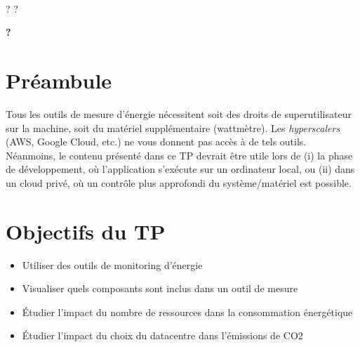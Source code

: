\documentclass[a4paper,10pt]{article}
\newcommand{\tdtitle}{?}
\newcommand{\tdnumber}{?}
\newcommand{\tdlongtitle}{?}
\renewcommand{\maketitle}{%
  ~\\
  \begin{center}
    {\huge \tdtitle{} \tdnumber{} 
    }%
  \end{center}
  \vspace{.3cm}
  \begin{center}
    {\LARGE \textbf \tdlongtitle 
    }%
  \end{center}
  \vspace{.5cm}
}
\begin{document}
\renewcommand{\labelitemi}{$\bullet$}

\maketitle



\section*{Préambule}
Tous les outils de mesure d'énergie nécessitent soit des droits de
superutilisateur sur la machine, soit du matériel supplémentaire (wattmètre).
Les \textit{hyperscalers} (AWS, Google Cloud, etc.) ne vous donnent pas accès à
de tels outils. Néanmoins, le contenu présenté dans ce TP devrait être utile
lors de (i) la phase de développement, où l'application s'exécute sur un
ordinateur local, ou (ii) dans un cloud privé, où un contrôle plus approfondi du
système/matériel est possible.


\section{Objectifs du TP}

\begin{itemize}
  \item Utiliser des outils de monitoring d’énergie
  \item Visualiser quels composants sont inclus dans un outil de mesure
  \item Étudier l’impact du nombre de ressources dans la consommation énergétique
  \item Étudier l’impact du choix du datacentre dans l'émissions de CO2 
\end{itemize}





\end{document}
